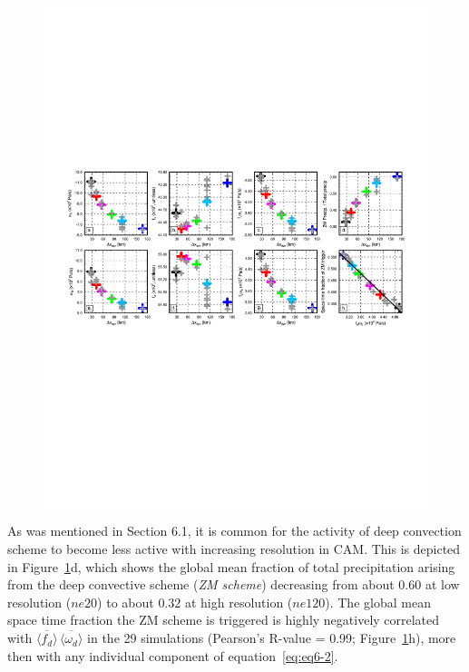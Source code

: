 \begin{figure}[t]
\begin{center}
\noindent\includegraphics[width=40pc,angle=0]{chapter6/temp_diags_8panel.pdf}\\
\end{center}
\caption{}
\label{fig:8panel}
\end{figure}

As was mentioned in Section 6.1, it is common for the activity of deep convection scheme to become less active with increasing resolution in CAM. This is depicted in Figure~\ref{fig:8panel}d, which shows the global mean fraction of total precipitation arising from the deep convective scheme ({\em{ZM scheme}}) decreasing from about $0.60$ at low resolution ($ne20$) to about $0.32$ at high resolution ($ne120$). The global mean space time fraction the ZM scheme is triggered is highly negatively correlated with $\overline{\langle f_{d} \rangle} \, \overline{\langle \omega_{d} \rangle}$ in the 29 simulations (Pearson's R-value = 0.99; Figure~\ref{fig:8panel}h), more then with any individual component of equation~\ref{eq:eq6-2}. 

